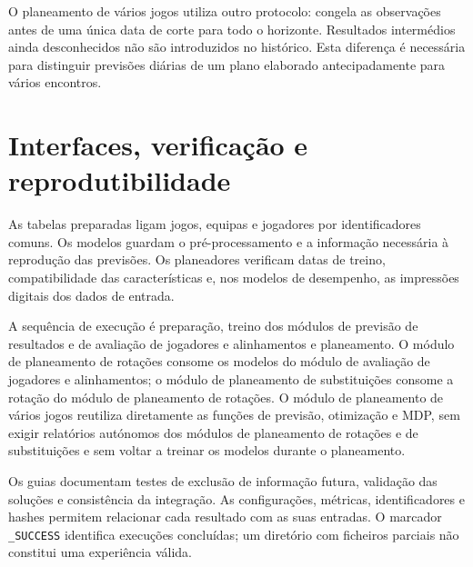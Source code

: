 O planeamento de vários jogos utiliza outro protocolo: congela as
observações antes de uma única data de corte para todo o horizonte.
Resultados intermédios ainda desconhecidos não são introduzidos no
histórico. Esta diferença é necessária para distinguir previsões diárias
de um plano elaborado antecipadamente para vários encontros.

\section{Interfaces, verificação e reprodutibilidade}

As tabelas preparadas ligam jogos, equipas e jogadores por identificadores
comuns. Os modelos guardam o pré-processamento e a informação necessária
à reprodução das previsões. Os planeadores verificam datas de treino,
compatibilidade das características e, nos modelos de desempenho,
as impressões digitais dos dados de entrada.

A sequência de execução é preparação, treino dos módulos de previsão de resultados e de avaliação de jogadores e alinhamentos e
planeamento. O módulo de planeamento de rotações consome os modelos do módulo de avaliação de jogadores e alinhamentos; o módulo de planeamento de substituições
consome a rotação do módulo de planeamento de rotações. O módulo de planeamento de vários jogos reutiliza diretamente as
funções de previsão, otimização e MDP, sem exigir relatórios autónomos dos
módulos de planeamento de rotações e de substituições e sem voltar a treinar os modelos durante o planeamento.

Os guias documentam testes de exclusão de informação futura, validação
das soluções e consistência da integração. As configurações, métricas,
identificadores e hashes permitem relacionar cada resultado com as suas
entradas. O marcador \texttt{\_SUCCESS} identifica execuções concluídas;
um diretório com ficheiros parciais não constitui uma experiência válida.
